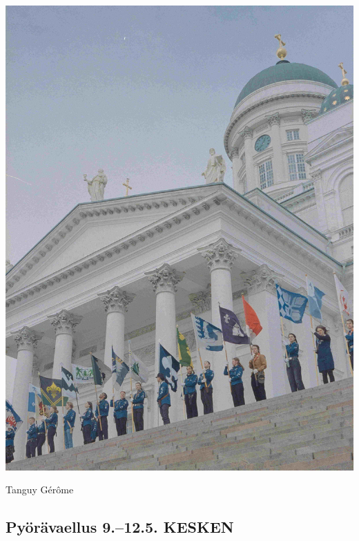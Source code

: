 \documentclass[10pt,finnish,a5paper,twoside=semi]{scrartcl}
\begin{document}
\begin{multicols}{2}
	\begin{center}
		\noindent\includegraphics[width=0.9\linewidth]{assets/paraati3}
	\end{center}


\end{multicols}


\medskip
\noindent\null\hfill Tanguy Gérôme



\clearpage
\subsection{Pyörävaellus 9.–12.5. KESKEN}
\end{document}

